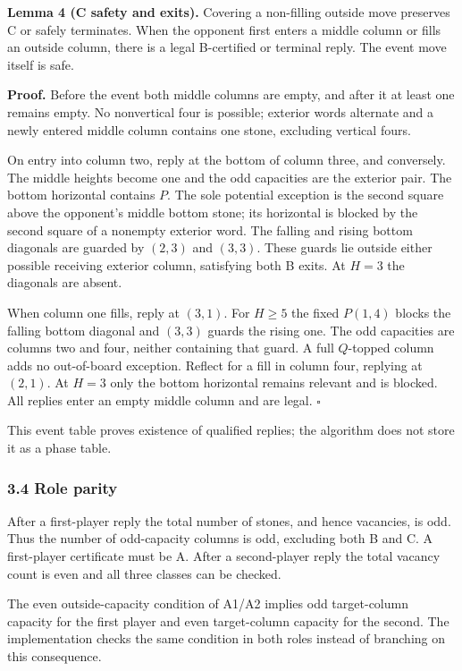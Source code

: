 \documentclass[
  a4paper,
]{article}
\newcounter{none} %
\begin{document}
\textbf{Lemma 4 (C safety and exits).} Covering a non-filling outside
move preserves C or safely terminates. When the opponent first enters a
middle column or fills an outside column, there is a legal B-certified
or terminal reply. The event move itself is safe.

\textbf{Proof.} Before the event both middle columns are empty, and
after it at least one remains empty. No nonvertical four is possible;
exterior words alternate and a newly entered middle column contains one
stone, excluding vertical fours.

On entry into column two, reply at the bottom of column three, and
conversely. The middle heights become one and the odd capacities are the
exterior pair. The bottom horizontal contains \(P\). The sole potential
exception is the second square above the opponent's middle bottom stone;
its horizontal is blocked by the second square of a nonempty exterior
word. The falling and rising bottom diagonals are guarded by \((2,3)\)
and \((3,3)\). These guards lie outside either possible receiving
exterior column, satisfying both B exits. At \(H=3\) the diagonals are
absent.

When column one fills, reply at \((3,1)\). For \(H\ge5\) the fixed
\(P(1,4)\) blocks the falling bottom diagonal and \((3,3)\) guards the
rising one. The odd capacities are columns two and four, neither
containing that guard. A full \(Q\)-topped column adds no out-of-board
exception. Reflect for a fill in column four, replying at \((2,1)\). At
\(H=3\) only the bottom horizontal remains relevant and is blocked. All
replies enter an empty middle column and are legal. \(\square\)

This event table proves existence of qualified replies; the algorithm
does not store it as a phase table.

\subsubsection{3.4 Role parity}\label{role-parity}

After a first-player reply the total number of stones, and hence
vacancies, is odd. Thus the number of odd-capacity columns is odd,
excluding both B and C. A first-player certificate must be A. After a
second-player reply the total vacancy count is even and all three
classes can be checked.

The even outside-capacity condition of A1/A2 implies odd target-column
capacity for the first player and even target-column capacity for the
second. The implementation checks the same condition in both roles
instead of branching on this consequence.
\end{document}
